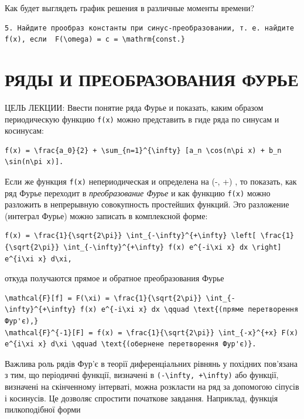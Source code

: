 \documentclass[
  ukrainian,
]{article}
\begin{document}
Как будет выглядеть график решения в различные моменты времени?

\begin{verbatim}
5. Найдите прообраз константы при синус-преобразовании, т. е. найдите f(x), если  F(\omega) = c = \mathrm{const.}
\end{verbatim}

\section{РЯДЫ И ПРЕОБРАЗОВАНИЯ
ФУРЬЕ}\label{ux440ux44fux434ux44b-ux438-ux43fux440ux435ux43eux431ux440ux430ux437ux43eux432ux430ux43dux438ux44f-ux444ux443ux440ux44cux435}

ЦЕЛЬ ЛЕКЦИИ: Ввести понятие ряда Фурье и показать, каким образом
периодическую функцию \texttt{f(x)} можно представить в гиде ряда по
синусам и косинусам:

\begin{verbatim}
f(x) = \frac{a_0}{2} + \sum_{n=1}^{\infty} [a_n \cos(n\pi x) + b_n \sin(n\pi x)].
\end{verbatim}

Если же функция \texttt{f(x)} непериодическая и определена на (-\infty,
+\infty) , то показать, как ряд Фурье переходит в \emph{преобразование
Фурье} и как функцию \texttt{f(x)} можно разложить в непрерывную
совокупность простейших функций. Эго разложение (интеграл Фурье) можно
записать в комплексной форме:

\begin{verbatim}
f(x) = \frac{1}{\sqrt{2\pi}} \int_{-\infty}^{+\infty} \left[ \frac{1}{\sqrt{2\pi}} \int_{-\infty}^{+\infty} f(x) e^{-i\xi x} dx \right] e^{i\xi x} d\xi,
\end{verbatim}

откуда получаются прямое и обратное преобразования Фурье

\begin{verbatim}
\mathcal{F}[f] = F(\xi) = \frac{1}{\sqrt{2\pi}} \int_{-\infty}^{+\infty} f(x) e^{-i\xi x} dx \qquad \text{(пряме перетворення Фур'є),}
\mathcal{F}^{-1}[F] = f(x) = \frac{1}{\sqrt{2\pi}} \int_{-x}^{+x} F(x) e^{i\xi x} d\xi \qquad \text{(обернене перетворення Фур'є)}.
\end{verbatim}

Важлива роль рядів Фур'є в теорії диференціальних рівнянь у похідних
пов'язана з тим, що періодичні функції, визначені в
\texttt{(-\textbackslash{}infty,\ +\textbackslash{}infty)} або функції,
визначені на скінченному інтерваті, можна розкласти на ряд за допомогою
сіпусів і косинусів. Це дозволяє спростити початкове завдання.
Наприклад, функція пилкоподібної форми
\end{document}

